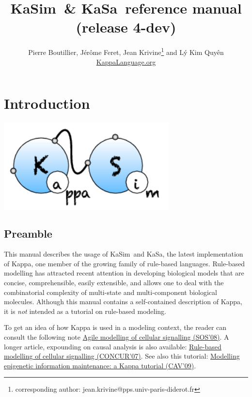 \documentclass[11pt]{book}
\title{KaSim\version~\& KaSa\version~reference manual\\ \small (release 4-dev)}
\author{Pierre Boutillier, J\'er\^ome Feret, Jean Krivine\thanks{corresponding author: jean.krivine@pps.univ-paris-diderot.fr} and L\'y Kim Quy\^en \\\url{KappaLanguage.org}}
\date{}
\def\KaSim{\textsf{KaSim}}
\def\KaSa{\textsf{KaSa}}
\begin{document}
\maketitle


\tableofcontents
\listoftables

\chapter{Introduction}
\begin{center}\includegraphics[width=9cm]{img/KaSim-logo.png}\end{center}

\section{Preamble}
This manual describes the usage of \KaSim~and \KaSa, the latest implementation of Kappa, one member of the growing family of rule-based languages. Rule-based modelling has attracted recent attention in developing biological models that are concise, comprehensible, easily extensible, and allows one to deal with the combinatorial complexity of multi-state and multi-component biological molecules. 
Although this manual contains a self-contained description of Kappa, it is \emph{not} intended as a tutorial on rule-based modeling.%
%

To get an idea of how Kappa is used in a modeling context, the reader can consult the following note \href{http://www.pps.jussieu.fr/~danos/pdf/eov.pdf}{Agile modelling of cellular signalling (SOS'08)}. A longer article, expounding on causal analysis is also available: \href{http://www.pps.jussieu.fr/~danos/pdf/ka-fix.pdf}{Rule-based modelling of cellular signalling (CONCUR'07)}. See also this tutorial: \href{http://www.pps.jussieu.fr/~danos/pdf/mytdg.pdf}{Modelling epigenetic information maintenance: a Kappa tutorial (CAV'09)}.
\end{document}
